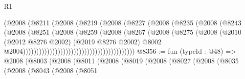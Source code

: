 \begin{lexlean}{R1}
\begin{coremodule}
                                                (@2008
                                                  (@8211
                                                    (@2008
                                                      (@8219
                                                        (@2008
                                                          (@8227
                                                            (@2008
                                                              (@8235
                                                                (@2008
                                                                  (@8243
                                                                    (@2008
                                                                      (@8251
                                                                        (@2008
                                                                          (@8259
                                                                            (@2008
                                                                              (@8267
                                                                                (@2008
                                                                                  (@8275
                                                                                    (@2008
                                                                                      (@2010
                                                                                        (@2012
                                                                                          @8276
                                                                                          @2002)
                                                                                        (@2019
                                                                                          @8276
                                                                                          @2002)
                                                                                        @8002
                                                                                        @2004))))))))))))))))))))))))))))))))))))))))))
@8356 := fun (typeId : @48) =>
  @2008
    (@8003
      (@2008
        (@8011
          (@2008
            (@8019
              (@2008
                (@8027
                  (@2008
                    (@8035
                      (@2008
                        (@8043
                          (@2008
                            (@8051

\end{coremodule}
\end{lexlean}
